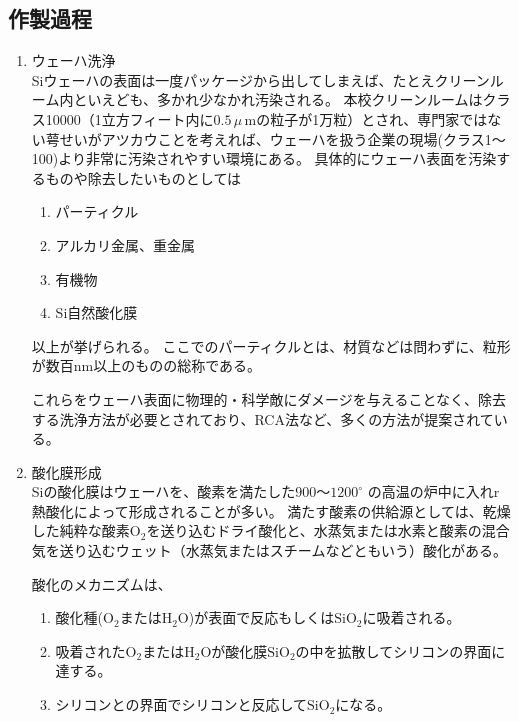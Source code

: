 \documentclass[11pt]{jarticle}
\begin{document}
	\subsection{作製過程}
		\begin{enumerate}
			\item ウェーハ洗浄\\
				Siウェーハの表面は一度パッケージから出してしまえば、たとえクリーンルーム内といえども、多かれ少なかれ汚染される。
				本校クリーンルームはクラス10000（1立方フィート内に$0.5\,\mu$\,mの粒子が1万粒）とされ、専門家ではない萼せいがアツカウことを考えれば、ウェーハを扱う企業の現場(クラス1〜100)より非常に汚染されやすい環境にある。
				具体的にウェーハ表面を汚染するものや除去したいものとしては

				\begin{enumerate}
					\item パーティクル\\
					\item アルカリ金属、重金属\\
					\item 有機物\\
					\item Si自然酸化膜\\
				\end{enumerate}

				以上が挙げられる。
				ここでのパーティクルとは、材質などは問わずに、粒形が数百nm以上のものの総称である。

				これらをウェーハ表面に物理的・科学敵にダメージを与えることなく、除去する洗浄方法が必要とされており、RCA法など、多くの方法が提案されている。

			\item 酸化膜形成\\
				Siの酸化膜はウェーハを、酸素を満たした$900〜1200^\circ$ の高温の炉中に入れr熱酸化によって形成されることが多い。
				満たす酸素の供給源としては、乾燥した純粋な酸素$\mathrm{O}_{2}$を送り込むドライ酸化と、水蒸気または水素と酸素の混合気を送り込むウェット（水蒸気またはスチームなどともいう）酸化がある。

				酸化のメカニズムは、

					\begin{enumerate}
						\item 酸化種($\mathrm{O}_{2}$または$\mathrm{H}_{2}\mathrm{O}$)が表面で反応もしくは$\mathrm{SiO}_{2}$に吸着される。\\
						\item 吸着された$\mathrm{O}_{2}$または$\mathrm{H}_{2}\mathrm{O}$が酸化膜$\mathrm{SiO}_{2}$の中を拡散してシリコンの界面に達する。\\
						\item シリコンとの界面でシリコンと反応して$\mathrm{SiO}_{2}$になる。\\
					\end{enumerate}
				

\end{enumerate}
\end{document}
